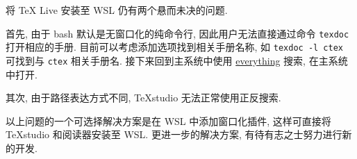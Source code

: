 将 \TeX{} Live 安装至 WSL 仍有两个悬而未决的问题.

首先, 由于 \textsf{bash} 默认是无窗口化的纯命令行,
因此用户无法直接通过命令 \texttt{texdoc} 打开相应的手册.
目前可以考虑添加选项找到相关手册名称,
如 \texttt{texdoc -l ctex} 可找到与 \texttt{ctex} 相关手册名.
接下来回到主系统中使用 \href{https://www.voidtools.com/zh-cn/}{everything} 搜索,
在主系统中打开.

其次, 由于路径表达方式不同, \TeX studio 无法正常使用正反搜索.

以上问题的一个可选择解决方案是在 WSL 中添加窗口化插件,
这样可直接将 \TeX studio 和阅读器安装至 WSL.
更进一步的解决方案, 有待有志之士努力进行新的开发.

